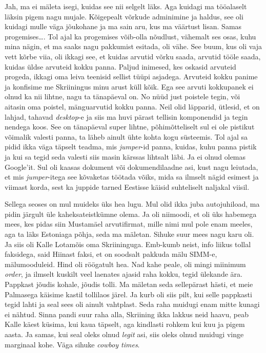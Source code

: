 Jah, ma ei mäleta isegi, kuidas see nii selgelt läks. Aga kuidagi ma tööalaselt 
läksin pigem nagu mujale. Kõigepealt võrkude adminimine ja haldus, see oli 
kuidagi mulle väga jõukohane ja ma sain aru, kus ma väärtust lisan. Samas 
progemises\ldots. Tol ajal ka progemises võib-olla nõudlust, vähemalt ses osas, 
kuhu mina nägin, et ma saaks nagu pakkumist esitada, oli vähe. See  buum, kus 
oli vaja vett kõrbe viia, oli ikkagi see, et kuidas arvutid võrku saada, 
arvutid tööle saada, kuidas üldse arvuteid kokku panna. Paljud inimesed, kes 
oskasid arvuteid progeda, ikkagi oma leiva teenisid sellist tüüpi asjadega. 
Arvuteid kokku panime ja konfisime me Skriiningus  minu arust küll kõik. 
Ega see arvuti kokkupanek ei olnud ka nii lihtne, nagu ta tänapäeval on. No 
nüüd just poistele tegin, või aitasin oma poistel, mänguarvutid  kokku panna. 
Neil olid läpparid, ütlesid, et  on lahjad, tahavad \emph{desktop}-e ja 
siis ma huvi pärast tellisin komponendid ja tegin nendega koos. See on 
tänapäeval super lihtne, põhimõtteliselt sul ei ole pistikut võimalik valesti 
panna, ta läheb ainult ühte kohta kogu süsteemis. Tol ajal sa pidid ikka väga 
täpselt teadma, mis \emph{jumper}-id panna, kuidas, kuhu panna pistik ja kui sa 
tegid seda valesti siis masin kärssas lihtsalt läbi. Ja ei olnud olemas 
Google'it. Sul oli kaasas dokument või dokumendilaadne asi, kust nagu leiutada, 
et mis \emph{jumper}-itega see kõvaketas töötada võiks, mida sa ilmselt nägid 
esimest ja viimast korda, sest  ka  juppide tarned Eestisse käisid suhteliselt 
naljakal viisil. 


Sellega seoses on mul muideks üks hea lugu. Mul olid ikka juba autojuhiload, ma 
pidin järgult üle kaheksateistkümne olema. Ja oli niimoodi, et oli üks habemega 
mees, kes pidas siin Mustamäel arvutifirmat, mille nimi mul pole enam meeles, 
aga ta läks Estoniaga põhja, seda ma mäletan. Sihuke suur mees nagu karu oli. 
Ja siis oli Kalle Lotamõis oma Skriininguga. Emb-kumb neist, 
info liikus tollal faksidega, said Hiinast faksi, et on soodsalt pakkuda mälu 
SIMM-e, mälumooduleid. Hind oli röögatult hea. Nad kahe peale, oli mingi 
miinimum \emph{order},  ja ilmselt kuskilt veel  laenates ajasid raha kokku, 
tegid  ülekande ära. Pappkast jõudis kohale, jõudis tolli. Ma mäletan seda 
sellepärast hästi, et meie Palmasega käisime kastil tollilaos järel. Ja kurb 
oli siis pilt, kui selle pappkasti tegid lahti ja seal sees oli ainult 
vahtplast. Seda raha muidugi enam mitte kunagi ei nähtud. Sinna pandi suur raha 
alla, Skriining ikka lakkus neid haavu, peab Kalle käest küsima, kui kaua 
täpselt, aga kindlasti rohkem kui kuu ja pigem aasta. Ja samas, kui seal oleks 
olnud \emph{legit} asi, siis  oleks olnud muidugi vinge marginaal kohe. Väga 
sihuke \emph{cowboy times}. 

